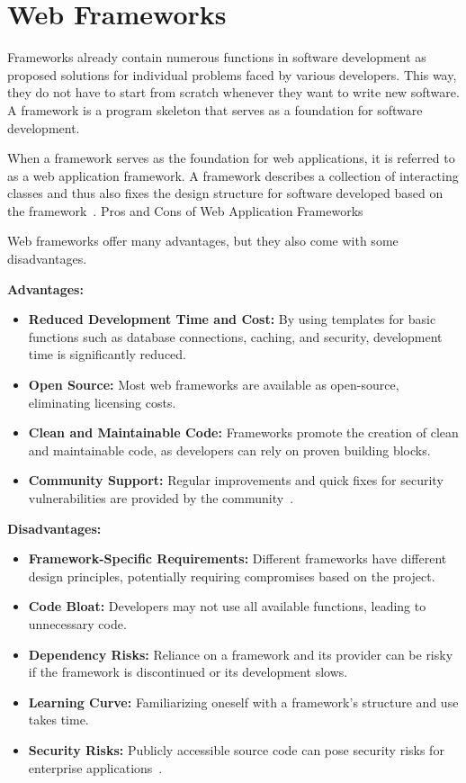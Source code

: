 \section{Web Frameworks}

Frameworks already contain numerous functions in software development as proposed solutions for individual problems faced by various developers. This way, they do not have to start from scratch whenever they want to write new software. A framework is a program skeleton that serves as a foundation for software development.

When a framework serves as the foundation for web applications, it is referred to as a web application framework. A framework describes a collection of interacting classes and thus also fixes the design structure for software developed based on the framework~\cite{ionos_webframeworks}.
Pros and Cons of Web Application Frameworks

Web frameworks offer many advantages, but they also come with some disadvantages.

\textbf{Advantages:}
\begin{itemize}
    \item \textbf{Reduced Development Time and Cost:} By using templates for basic functions such as database connections, caching, and security, development time is significantly reduced.
    \item \textbf{Open Source:} Most web frameworks are available as open-source, eliminating licensing costs.
    \item \textbf{Clean and Maintainable Code:} Frameworks promote the creation of clean and maintainable code, as developers can rely on proven building blocks.
    \item \textbf{Community Support:} Regular improvements and quick fixes for security vulnerabilities are provided by the community~\cite{ionos_webframeworks}.
\end{itemize}

\textbf{Disadvantages:}
\begin{itemize}
    \item \textbf{Framework-Specific Requirements:} Different frameworks have different design principles, potentially requiring compromises based on the project.
    \item \textbf{Code Bloat:} Developers may not use all available functions, leading to unnecessary code.
    \item \textbf{Dependency Risks:} Reliance on a framework and its provider can be risky if the framework is discontinued or its development slows.
    \item \textbf{Learning Curve:} Familiarizing oneself with a framework’s structure and use takes time.
    \item \textbf{Security Risks:} Publicly accessible source code can pose security risks for enterprise applications~\cite{ionos_webframeworks}.
\end{itemize}

